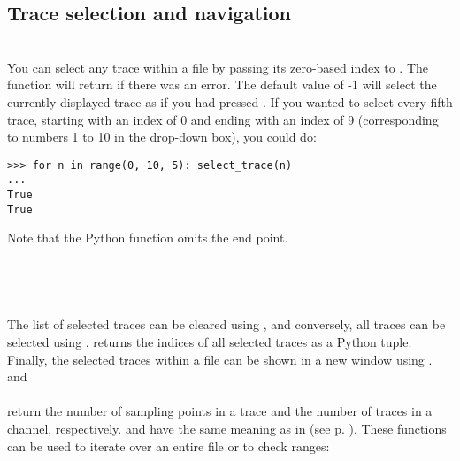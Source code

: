\subsection{Trace selection and navigation}
\\
You can select any trace within a file by passing its zero-based index to . The function will return  if there was an error. The default value of -1 will select the currently displayed trace as if you had pressed . If you wanted to select every fifth trace, starting with an index of 0 and ending with an index of 9 (corresponding to numbers 1 to 10 in the drop-down box), you could do:
\begin{lstlisting}
>>> for n in range(0, 10, 5): select_trace(n)
...
True
True
\end{lstlisting}
Note that the Python  function omits the end point.\smallskip \\
\noindent{}\\
\noindent{}\\
\noindent{}\\
\noindent{}\\
\noindent The list of selected traces can be cleared using , and conversely, all traces can be selected using .  returns the indices of all selected traces as a Python tuple. Finally, the selected traces within a file can be shown in a new window using .\smallskip \\
\noindent{} and\\
\noindent{}\\
return the number of sampling points in a trace and the number of traces in a channel, respectively.  and  have the same meaning as in  (see p. \pageref{gettrace}). These functions can be used to iterate over an entire file or to check ranges:
